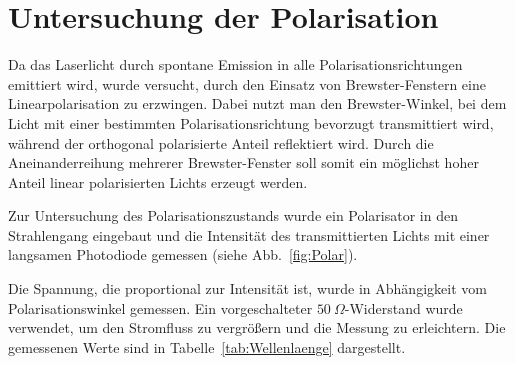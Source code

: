 \chapter{Untersuchung der Polarisation}

Da das Laserlicht durch spontane Emission in alle Polarisationsrichtungen emittiert wird, wurde versucht, durch den Einsatz von Brewster-Fenstern eine Linearpolarisation zu erzwingen. 
Dabei nutzt man den Brewster-Winkel, bei dem Licht mit einer bestimmten Polarisationsrichtung bevorzugt transmittiert wird, während der orthogonal polarisierte Anteil reflektiert wird. 
Durch die Aneinanderreihung mehrerer Brewster-Fenster soll somit ein möglichst hoher Anteil linear polarisierten Lichts erzeugt werden.


Zur Untersuchung des Polarisationszustands wurde ein Polarisator in den Strahlengang eingebaut und die Intensität des transmittierten Lichts mit einer langsamen Photodiode gemessen (siehe Abb.~\ref{fig:Polar}).



Die Spannung, die proportional zur Intensität ist, wurde in Abhängigkeit vom Polarisationswinkel gemessen. 
Ein vorgeschalteter $50~\Omega$-Widerstand wurde verwendet, um den Stromfluss zu vergrößern und die Messung zu erleichtern. 
Die gemessenen Werte sind in Tabelle~\ref{tab:Wellenlaenge} dargestellt.

